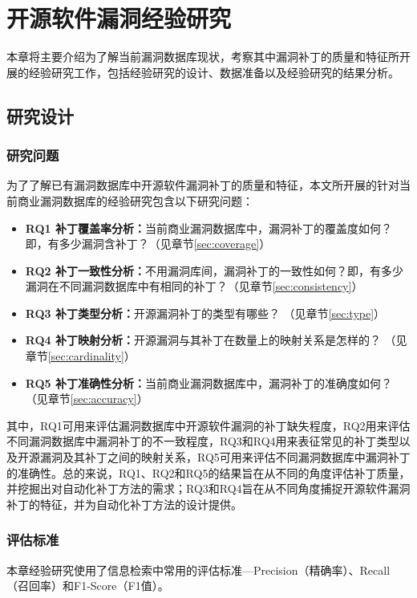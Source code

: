\chapter{开源软件漏洞经验研究}\label{sec:study}

本章将主要介绍为了解当前漏洞数据库现状，考察其中漏洞补丁的质量和特征所开展的经验研究工作，包括经验研究的设计、数据准备以及经验研究的结果分析。


\section{研究设计}
\subsection{研究问题}
为了了解已有漏洞数据库中开源软件漏洞补丁的质量和特征，本文所开展的针对当前商业漏洞数据库的经验研究包含以下研究问题：

\begin{itemize}[leftmargin=*]
    \item \textbf{RQ1 补丁覆盖率分析：}当前商业漏洞数据库中，漏洞补丁的覆盖度如何？即，有多少漏洞含补丁？（见章节\ref{sec:coverage}）
    \item \textbf{RQ2 补丁一致性分析：}不用漏洞库间，漏洞补丁的一致性如何？即，有多少漏洞在不同漏洞数据库中有相同的补丁？（见章节\ref{sec:consistency}）
    \item \textbf{RQ3 补丁类型分析：}开源漏洞补丁的类型有哪些？ （见章节\ref{sec:type}）
    \item \textbf{RQ4 补丁映射分析：}开源漏洞与其补丁在数量上的映射关系是怎样的？ （见章节\ref{sec:cardinality}）
    \item \textbf{RQ5 补丁准确性分析：}当前商业漏洞数据库中，漏洞补丁的准确度如何？ （见章节\ref{sec:accuracy}）
\end{itemize}
    
其中，RQ1可用来评估漏洞数据库中开源软件漏洞的补丁缺失程度，RQ2用来评估不同漏洞数据库中漏洞补丁的不一致程度，RQ3和RQ4用来表征常见的补丁类型以及开源漏洞及其补丁之间的映射关系，RQ5可用来评估不同漏洞数据库中漏洞补丁的准确性。总的来说，RQ1、RQ2和RQ5的结果旨在从不同的角度评估补丁质量，并挖掘出对自动化补丁方法的需求；RQ3和RQ4旨在从不同角度捕捉开源软件漏洞补丁的特征，并为自动化补丁方法的设计提供。

\subsection{评估标准}\label{sec:metric}
本章经验研究使用了信息检索中常用的评估标准---Precision（精确率）、Recall（召回率）和F1-Score（F1值）。

